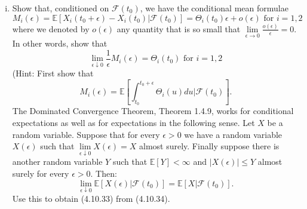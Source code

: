\documentclass{article}
\newcommand{\E}{\mathbb{E}}
\newcommand{\F}{\mathcal{F}}
\newcommand{\eps}{\epsilon}
\newcommand{\abs}[1]{\left| #1 \right|}
\newcommand{\limit}[1]{\underset{#1}{\lim}}
\theoremstyle{definition}
\theoremstyle{definition}
\begin{document}
\begin{enumerate}
\begin{enumerate}[(i)]
       \item Show that, conditioned on $\F(t_0)$, we have the conditional mean formulae
       \begin{equation}
           M_i(\eps)= \E[X_i(t_0+\eps)-X_i(t_0)|\F(t_0)]= \Theta_i(t_0) \eps + o(\eps) \text{ for } i=1,2 \tag{4.10.32}
       \end{equation}
       where we denoted by $o(\eps)$ any quantity that is so small that $\limit{\eps \to 0}\frac{o(\eps)}{\eps}=0$. In other words, show that
       \begin{equation} \limit{\eps \downarrow 0} \frac{1}{\eps}M_i(\eps) = \Theta_i(t_0) \text{ for } i=1,2 \tag{4.10.33} \end{equation}
       (Hint: First show that
       \begin{equation} M_i(\eps) = \E\left[ \int_{t_0}^{t_0+\eps} \Theta_i(u)du|\F(t_0)\right]. \tag{4.10.34} \end{equation}
       The Dominated Convergence Theorem, Theorem 1.4.9, works for conditional expectations as well as for expectations in the following sense. Let $X$ be a random variable. Suppose that for every $\eps>0$ we have a random variable $X(\eps)$ such that $\limit{\eps \downarrow 0} X(\eps)=X$ almost surely. Finally suppose there is another random variable $Y$ such that $\E[Y]<\infty$ and $\abs{X(\eps)}\leq Y$ almost surely for every $\eps>0$. Then:
       $$ \limit{\eps \downarrow 0}\E[X(\eps)|\F(t_0)]=\E[X|\F(t_0)].$$
       Use this to obtain (4.10.33) from (4.10.34).
       

\end{enumerate}
\end{enumerate}
\end{document}
